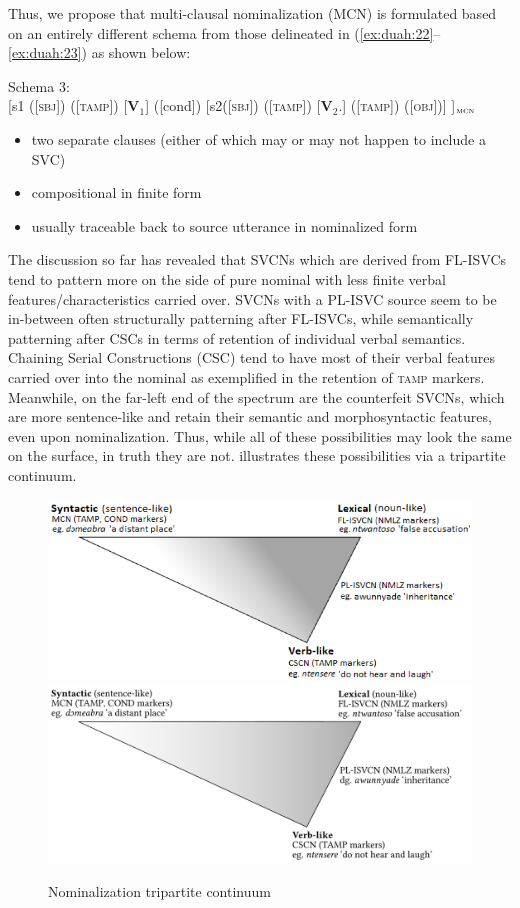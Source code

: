 \documentclass[output=paper,modfonts,nonflat,
colorlinks, citecolor=brown,
]{langsci/langscibook}
\begin{document}
Thus, we propose that multi-clausal nominalization (MCN) is formulated based on an entirely different schema from those delineated in (\ref{ex:duah:22}--\ref{ex:duah:23}) as shown below:

\ea
Schema 3:\\{}
[s1 ([\textsc{sbj}]) ([\textsc{tamp}]) [\textbf{V}$_1$] ([cond])	[s2([\textsc{sbj}]) ([\textsc{tamp}])
										[\textbf{V}$_2$.]	([\textsc{tamp}]) ([\textsc{obj}])] ]$_{\textsc{mcn}}$
\begin{itemize}
\item two separate clauses (either of which may or may not happen to include a SVC)
\item compositional in finite form
\item usually traceable back to source utterance in nominalized form
\end{itemize}
\z

The discussion so far has revealed that SVCNs which are derived from FL-ISVCs tend to pattern more on the side of pure nominal with less finite verbal features/characteristics carried over. SVCNs with a PL-ISVC source seem to be in-between often structurally patterning after FL-ISVCs, while semantically patterning after CSCs in terms of retention of individual verbal semantics. Chaining Serial Constructions (CSC) tend to have most of their verbal features carried over into the nominal as exemplified in the retention of \textsc{tamp} markers. Meanwhile, on the far-left end of the spectrum are the counterfeit SVCNs, which are more sentence-like and retain their semantic and morphosyntactic features, even upon nominalization. Thus, while all of these possibilities may look the same on the surface, in truth they are not.  illustrates these possibilities via a tripartite continuum.

\begin{figure}
\includegraphics[width=\textwidth]{fig-duah-2.png}
\includegraphics[width=\textwidth]{fig-duah-2.pdf}
\caption{Nominalization tripartite continuum}
\label{fig:duah:4}
\end{figure}
\end{document}
